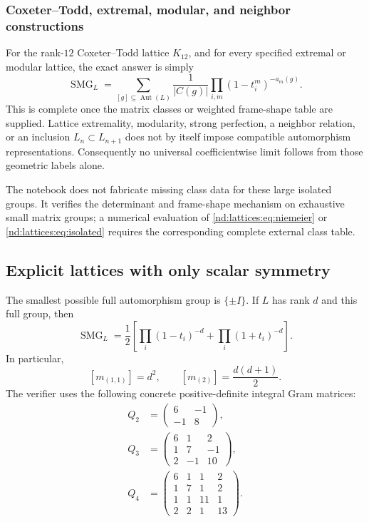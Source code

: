 \documentclass[10pt]{article}
\newcommand{\SMG}{\operatorname{SMG}}
\newcommand{\MGF}{\SMG}
\newcommand{\Aut}{\operatorname{Aut}}
\begin{document}
\subsubsection*{Coxeter--Todd, extremal, modular, and neighbor constructions}
For the rank-$12$ Coxeter--Todd lattice $K_{12}$, and for every specified
extremal or modular lattice, the exact answer is simply
\begin{equation}\label{nd:lattices:eq:isolated}
 \MGF_L=\sum_{[g]\subseteq\Aut(L)}\frac1{|C(g)|}
 \prod_{i,m}(1-t_i^m)^{-a_m(g)}.
\end{equation}
This is complete once the matrix classes or weighted frame-shape table are
supplied.  Lattice extremality, modularity, strong perfection, a neighbor
relation, or an inclusion $L_n\subset L_{n+1}$ does not by itself impose
compatible automorphism representations.  Consequently no universal
coefficientwise limit follows from those geometric labels alone.

The notebook does not fabricate missing class data for these large isolated
groups.  It verifies the determinant and frame-shape mechanism on exhaustive
small matrix groups; a numerical evaluation of \eqref{nd:lattices:eq:niemeier} or
\eqref{nd:lattices:eq:isolated} requires the corresponding complete external class table.

\subsection{Explicit lattices with only scalar symmetry}

The smallest possible full automorphism group is $\{\pm I\}$.  If $L$ has
rank $d$ and this full group, then
\begin{equation}\label{nd:lattices:eq:scalar-series}
 \boxed{\MGF_L=\frac12\left[
 \prod_i(1-t_i)^{-d}+\prod_i(1+t_i)^{-d}\right].}
\end{equation}
In particular,
\begin{equation}\label{nd:lattices:eq:scalar-low}
 [m_{(1,1)}]=d^2,\qquad [m_{(2)}]=\frac{d(d+1)}2.
\end{equation}
The verifier uses the following concrete positive-definite integral Gram
matrices:
\begin{align*}
 Q_2&=\begin{pmatrix}6&-1\\-1&8\end{pmatrix},\\
 Q_3&=\begin{pmatrix}6&1&2\\1&7&-1\\2&-1&10\end{pmatrix},\\
 Q_4&=\begin{pmatrix}6&1&1&2\\1&7&1&2\\1&1&11&1\\2&2&1&13\end{pmatrix}.
\end{align*}
\end{document}
